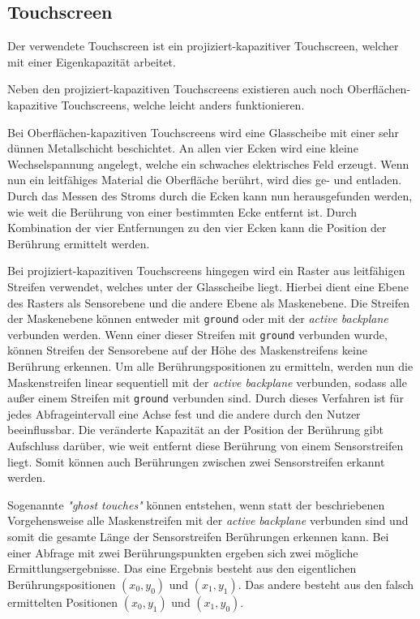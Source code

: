 \subsection{Touchscreen}

Der verwendete Touchscreen ist ein projiziert-kapazitiver Touchscreen, welcher mit einer Eigenkapazität arbeitet. \cite[\itshape4.4~Touch~panel]{ts-userManual}

Neben den projiziert-kapazitiven Touchscreens existieren auch noch Oberflächen-kapazitive Touchscreens, welche leicht anders funktionieren.

Bei Oberflächen-kapazitiven Touchscreens wird eine Glasscheibe mit einer sehr dünnen Metallschicht beschichtet.
An allen vier Ecken wird eine kleine Wechselspannung angelegt, welche ein schwaches elektrisches Feld erzeugt.
Wenn nun ein leitfähiges Material die Oberfläche berührt, wird dies ge- und entladen.
Durch das Messen des Stroms durch die Ecken kann nun herausgefunden werden, wie weit die Berührung von einer bestimmten Ecke entfernt ist.
Durch Kombination der vier Entfernungen zu den vier Ecken kann die Position der Berührung ermittelt werden.
\cite[\itshape8~Findings~and~Discussion]{ts-holzinger}

Bei projiziert-kapazitiven Touchscreens hingegen wird ein Raster aus leitfähigen Streifen verwendet, welches unter der Glasscheibe liegt.
Hierbei dient eine Ebene des Rasters als Sensorebene und die andere Ebene als Maskenebene.
Die Streifen der Maskenebene können entweder mit \texttt{ground} oder mit der \textit{active backplane} verbunden werden.
Wenn einer dieser Streifen mit \texttt{ground} verbunden wurde, können Streifen der Sensorebene auf der Höhe des Maskenstreifens keine Berührung erkennen.
Um alle Berührungspositionen zu ermitteln, werden nun die Maskenstreifen linear sequentiell mit der \textit{active backplane} verbunden, sodass alle außer einem Streifen mit \texttt{ground} verbunden sind.
Durch dieses Verfahren ist für jedes Abfrageintervall eine Achse fest und die andere durch den Nutzer beeinflussbar.
Die veränderte Kapazität an der Position der Berührung gibt Aufschluss darüber, wie weit entfernt diese Berührung von einem Sensorstreifen liegt.
Somit können auch Berührungen zwischen zwei Sensorstreifen erkannt werden.
\cite{ts-self_capacitive_multitouch}

Sogenannte \textit{"ghost touches"} können entstehen, wenn statt der beschriebenen Vorgehensweise alle Maskenstreifen mit der \textit{active backplane} verbunden sind und somit die gesamte Länge der Sensorstreifen Berührungen erkennen kann.
Bei einer Abfrage mit zwei Berührungspunkten ergeben sich zwei mögliche Ermittlungsergebnisse.
Das eine Ergebnis besteht aus den eigentlichen Berührungspositionen $(x_0,y_0)$ und $(x_1,y_1)$.
Das andere besteht aus den falsch ermittelten Positionen $(x_0,y_1)$ und $(x_1,y_0)$.

